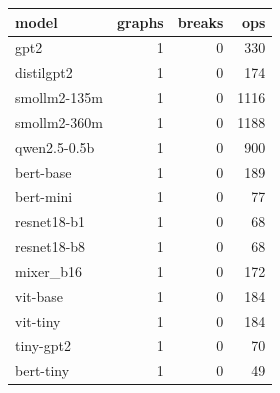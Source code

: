 \begin{tabular}{lrrr}
\toprule
model & graphs & breaks & ops \\
\midrule
gpt2 & 1 & 0 & 330 \\
distilgpt2 & 1 & 0 & 174 \\
smollm2-135m & 1 & 0 & 1116 \\
smollm2-360m & 1 & 0 & 1188 \\
qwen2.5-0.5b & 1 & 0 & 900 \\
bert-base & 1 & 0 & 189 \\
bert-mini & 1 & 0 & 77 \\
resnet18-b1 & 1 & 0 & 68 \\
resnet18-b8 & 1 & 0 & 68 \\
mixer\_b16 & 1 & 0 & 172 \\
vit-base & 1 & 0 & 184 \\
vit-tiny & 1 & 0 & 184 \\
tiny-gpt2 & 1 & 0 & 70 \\
bert-tiny & 1 & 0 & 49 \\
\bottomrule
\end{tabular}

